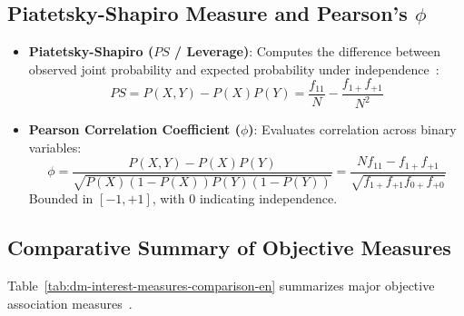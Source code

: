 \subsection{Piatetsky-Shapiro Measure and Pearson's $\phi$}
\begin{itemize}
    \item \textbf{Piatetsky-Shapiro ($PS$ / Leverage)}: Computes the difference between observed joint probability and expected probability under independence~\cite{piatetsky1991}:
    \begin{equation}
    \label{eq:dm-ps-leverage-en}
    PS = P(X, Y) - P(X)P(Y) = \frac{f_{11}}{N} - \frac{f_{1+} f_{+1}}{N^2}
    \end{equation}
    \item \textbf{Pearson Correlation Coefficient ($\phi$)}: Evaluates correlation across binary variables:
    \begin{equation}
    \label{eq:dm-phi-correlation-en}
    \phi = \frac{P(X, Y) - P(X)P(Y)}{\sqrt{P(X)(1-P(X))P(Y)(1-P(Y))}} = \frac{N f_{11} - f_{1+} f_{+1}}{\sqrt{f_{1+} f_{+1} f_{0+} f_{+0}}}
    \end{equation}
    Bounded in $[-1, +1]$, with $0$ indicating independence.
\end{itemize}

\subsection{Comparative Summary of Objective Measures}
Table~\ref{tab:dm-interest-measures-comparison-en} summarizes major objective association measures~\cite{tan2018}.

\begin{table}[htbp]
\centering
\small
\renewcommand{\arraystretch}{1.2}
\caption{Analytical formulations of objective statistical interest measures.}
\label{tab:dm-interest-measures-comparison-en}
\end{table}

